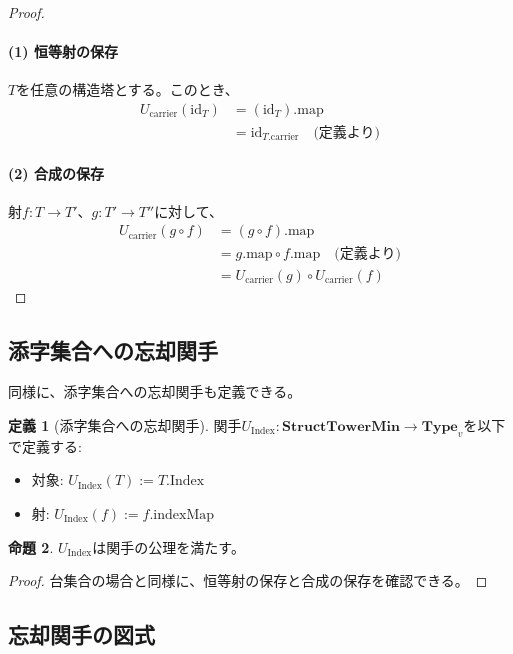 \documentclass[a4paper,12pt]{article}
\theoremstyle{definition}
\newtheorem{definition}{定義}[section]
\newtheorem{proposition}[definition]{命題}
\begin{document}
\begin{proof}
\paragraph{(1) 恒等射の保存}
$T$を任意の構造塔とする。このとき、
\begin{align*}
U_{\text{carrier}}(\text{id}_T) &= (\text{id}_T).\text{map} \\
&= \text{id}_{T.\text{carrier}} \quad \text{(定義より)}
\end{align*}

\paragraph{(2) 合成の保存}
射$f : T \to T'$、$g : T' \to T''$に対して、
\begin{align*}
U_{\text{carrier}}(g \circ f) &= (g \circ f).\text{map} \\
&= g.\text{map} \circ f.\text{map} \quad \text{(定義より)} \\
&= U_{\text{carrier}}(g) \circ U_{\text{carrier}}(f)
\end{align*}
\end{proof}

\subsection{添字集合への忘却関手}

同様に、添字集合への忘却関手も定義できる。

\begin{definition}[添字集合への忘却関手]\label{def:forget_index}
関手$U_{\text{Index}} : \mathbf{StructTowerMin} \to \mathbf{Type}_v$を以下で定義する:
\begin{itemize}
\item 対象: $U_{\text{Index}}(T) := T.\text{Index}$
\item 射: $U_{\text{Index}}(f) := f.\text{indexMap}$
\end{itemize}
\end{definition}

\begin{proposition}
$U_{\text{Index}}$は関手の公理を満たす。
\end{proposition}

\begin{proof}
台集合の場合と同様に、恒等射の保存と合成の保存を確認できる。
\end{proof}

\subsection{忘却関手の図式}
\end{document}
